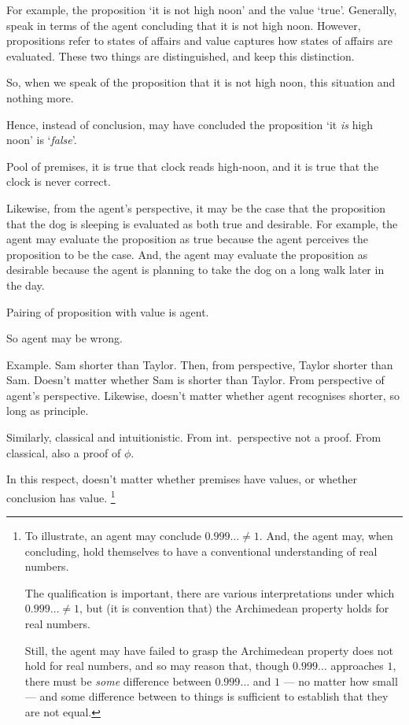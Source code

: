 \begin{note}
  For example, the proposition `it is not high noon' and the value `true'.
  Generally, speak in terms of the agent concluding that it is not high noon.
  However, propositions refer to states of affairs and value captures how states of affairs are evaluated.
  These two things are distinguished, and keep this distinction.

  So, when we speak of the proposition that it is not high noon, this situation and nothing more.

  Hence, instead of conclusion, may have concluded the proposition `it \emph{is} high noon' is `\emph{false}'.

  Pool of premises, it is true that clock reads high-noon, and it is true that the clock is never correct.

  Likewise, from the agent's perspective, it may be the case that the proposition that the dog is sleeping is evaluated as both true and desirable.
  For example, the agent may evaluate the proposition as true because the agent perceives the proposition to be the case.
  And, the agent may evaluate the proposition as desirable because the agent is planning to take the dog on a long walk later in the day.
\end{note}

\begin{note}
  Pairing of proposition with value is agent.

  So agent may be wrong.

  Example.
  Sam shorter than Taylor.
  Then, from perspective, Taylor shorter than Sam.
  Doesn't matter whether Sam is shorter than Taylor.
  From perspective of agent's perspective.
  Likewise, doesn't matter whether agent recognises shorter, so long as principle.

  Similarly, classical and intuitionistic.
  From int.\ perspective not a proof.
  From classical, also a proof of \(\phi\).

  In this respect, doesn't matter whether premises have values, or whether conclusion has value.%
  \footnote{
    To illustrate, an agent may conclude \(0.999\dots \ne 1\).
    And, the agent may, when concluding, hold themselves to have a conventional understanding of real numbers.

    The qualification is important, there are various interpretations under which \(0.999\dots \ne 1\), but (it is convention that) the Archimedean property holds for real numbers.

    Still, the agent may have failed to grasp the Archimedean property does not hold for real numbers, and so may reason that, though \(0.999\dots\) approaches \(1\), there must be \emph{some} difference between \(0.999\dots\) and \(1\) --- no matter how small --- and some difference between to things is sufficient to establish that they are not equal.
  }
\end{note}

